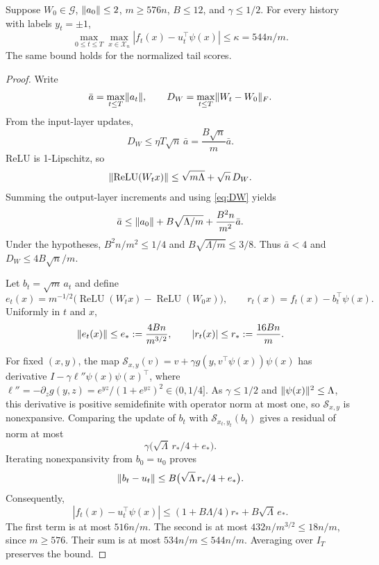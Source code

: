 \documentclass[11pt,letterpaper,pmlr,twoside]{jmlr}
\newcommand{\X}{\mathcal X}\newcommand{\Hc}{\mathcal H}
\newcommand{\relu}{\operatorname{ReLU}}\newcommand{\dc}{\operatorname{dc}}
\newcommand{\Gcal}{\mathcal G}\newcommand{\Bfr}{\mathfrak B}
\begin{document}
\begin{lemma}
\label{lem:score}
Suppose $W_0\in\Gcal$, $\lVert a_0\rVert\le2$, $m\ge576n$, $B\le12$, and $\gamma\le1/2$. For every history with labels $y_t=\pm1$,
\begin{equation}
 \max_{0\le t\le T}\max_{x\in\X_n}
   |f_t(x)-u_t^\top\psi(x)|\le\kappa=544n/m.
 \label{eq:score-compare}
\end{equation}
The same bound holds for the normalized tail scores.
\end{lemma}
\begin{proof}
Write
\[
 \bar a=\max_{t\le T}\lVert a_t\rVert,\qquad
 D_W=\max_{t\le T}\lVert W_t-W_0\rVert_F.
\]
From the input-layer updates,
\begin{equation}
 D_W\le\eta T\sqrt n\,\bar a=\frac{B\sqrt n}{m}\bar a.
 \label{eq:DW}
\end{equation}
ReLU is 1-Lipschitz, so
\[
 \norm{\relu(W_tx)}\le\sqrt{m\Lambda}+\sqrt n\,D_W.
\]
Summing the output-layer increments and using \eqref{eq:DW} yields
\[
 \bar a\le\lVert a_0\rVert+B\sqrt{\Lambda/m}+\frac{B^2n}{m^2}\bar a.
\]
Under the hypotheses, $B^2n/m^2\le1/4$ and $B\sqrt{\Lambda/m}\le3/8$. Thus $\bar a<4$ and $D_W\le4B\sqrt n/m$.

Let $b_t=\sqrt m\,a_t$ and define
\[
 e_t(x)=m^{-1/2}\bigl(\relu(W_tx)-\relu(W_0x)\bigr),
 \qquad r_t(x)=f_t(x)-b_t^\top\psi(x).
\]
Uniformly in $t$ and $x$,
\begin{equation}
 \lVert e_t(x)\rVert\le e_*:=\frac{4Bn}{m^{3/2}},
 \qquad |r_t(x)|\le r_*:=\frac{16Bn}{m}.
 \label{eq:residuals}
\end{equation}

For fixed $(x,y)$, the map $\mathcal S_{x,y}(v)=v+\gamma g(y,v^\top\psi(x))\psi(x)$ has derivative $I-\gamma\ell''\psi(x)\psi(x)^\top$, where $\ell''=-\partial_zg(y,z)=e^{yz}/(1+e^{yz})^2\in(0,1/4]$. As $\gamma\le1/2$ and $\lVert \psi(x)\rVert^2\le\Lambda$, this derivative is positive semidefinite with operator norm at most one, so $\mathcal S_{x,y}$ is nonexpansive. Comparing the update of $b_t$ with $\mathcal S_{x_t,y_t}(b_t)$ gives a residual of norm at most
\[
 \gamma\bigl(\sqrt\Lambda\,r_*/4+e_*\bigr).
\]
Iterating nonexpansivity from $b_0=u_0$ proves
\[
 \lVert b_t-u_t\rVert\le B\bigl(\sqrt\Lambda\,r_*/4+e_*\bigr).
\]
Consequently,
\[
 |f_t(x)-u_t^\top\psi(x)|
 \le(1+B\Lambda/4)r_*+B\sqrt\Lambda\,e_*.
\]
The first term is at most $516n/m$. The second is at most $432n/m^{3/2}\le18n/m$, since $m\ge576$. Their sum is at most $534n/m\le544n/m$. Averaging over $I_T$ preserves the bound.
\end{proof}
\end{document}
